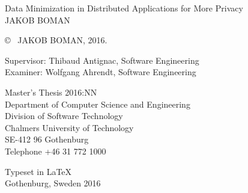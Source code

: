 \newpage
\thispagestyle{plain}
\vspace*{4.5cm}
Data Minimization in Distributed Applications for More Privacy\\
JAKOB BOMAN \setlength{\parskip}{1cm}

\copyright ~ JAKOB BOMAN, 2016. \setlength{\parskip}{1cm}

Supervisor: Thibaud Antignac, Software Engineering\\
Examiner: Wolfgang Ahrendt, Software Engineering \setlength{\parskip}{1cm}

Master's Thesis 2016:NN\\	%
Department of Computer Science and Engineering\\
Division of Software Technology\\
Chalmers University of Technology\\
SE-412 96 Gothenburg\\
Telephone +46 31 772 1000 \setlength{\parskip}{0.5cm}

\vfill

Typeset in \LaTeX \\
Gothenburg, Sweden 2016


